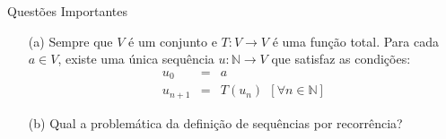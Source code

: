 \begin{frame}{Questões Importantes}
  \begin{itemize}
    \item[(a)] \cite{carmo2013} Sempre que $V$ é um conjunto e $T: V \rightarrow V$ é uma função total. Para cada $a \in V$, existe uma única sequência 
    $u: \mathbb{N} \rightarrow V$ que satisfaz as condições:
    \begin{eqnarray*}
      u_0 & = & a\\
      u_{n + 1} & = & T(u_{n}) \ \ [\forall n \in \mathbb{N}]
    \end{eqnarray*}
    \item[(b)] Qual a problemática da definição de sequências por recorrência?
  \end{itemize}
\end{frame}